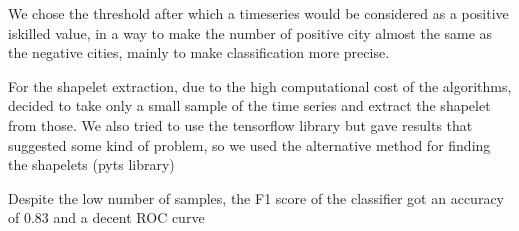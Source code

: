 We chose the threshold after which a timeseries would be considered as a positive is\textunderscore killed value, in a way to make the number of positive city almost the same as the negative cities, mainly to make classification more precise.

For the shapelet extraction, due to the high computational cost of the algorithms, decided to take only a small sample of the time series and extract the shapelet from those.
We also tried to use the tensorflow library but gave results that suggested some kind of problem, so we used the alternative method for finding the shapelets (pyts library)

Despite the low number of samples, the F1 score of the classifier got an accuracy of 0.83 and a decent ROC curve




















